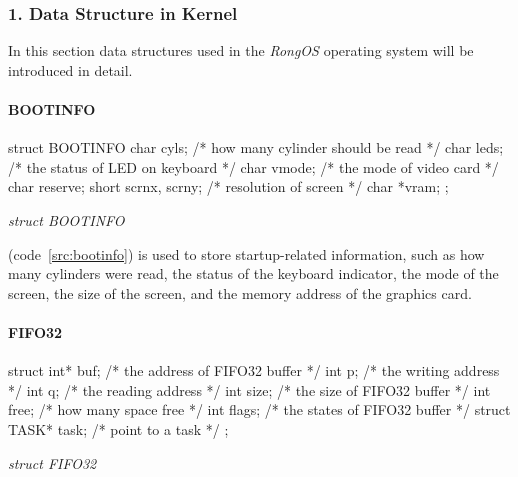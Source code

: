 \documentclass{swfcthesis}
\begin{document}
\iffalse %
\subsubsection{1. Data Structure in Kernel}
In this section data structures used in the \emph{RongOS} operating system will be introduced in
detail.

\paragraph{BOOTINFO}

\begin{listing}[H]
  \begin{codeblock}
\begin{ccode}
struct BOOTINFO
{
  char cyls;          /* how many cylinder should be read */
  char leds;          /* the status of LED on keyboard */
  char vmode;         /* the mode of video card */
  char reserve;
  short scrnx, scrny; /* resolution of screen */
  char *vram;
};
\end{ccode}
  \end{codeblock}
  \caption{\emph{struct BOOTINFO}}\label{src:bootinfo}
\end{listing}

(code~\ref{src:bootinfo}) is used to store startup-related
information, such as how many cylinders were read, the status of the keyboard indicator,
the mode of the screen, the size of the screen, and the memory address of the graphics
card.


\paragraph{FIFO32}

\begin{listing}[H]
  \begin{codeblock}
\begin{ccode}
struct 
{ 
  int* buf;          /* the address of FIFO32 buffer */
  int p;             /* the writing address */
  int q;             /* the reading address */
  int size;          /* the size of FIFO32 buffer */
  int free;          /* how many space free */
  int flags;         /* the states of FIFO32 buffer */
  struct TASK* task; /* point to a task */ 
};
\end{ccode}
  \end{codeblock}
  \caption{\emph{struct FIFO32}}\label{src:FIFO32}
\end{listing}
\end{document}
